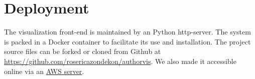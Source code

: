 \section{Deployment}
The visualization front-end is maintained by an Python http-server. The system is packed in a Docker container to facilitate its use and installation. The project source files can be forked or cloned from Github at \url{https://github.com/rosericazondekon/authorvis}. We also made it accessible online via an  \href{https://#}{AWS server}.



